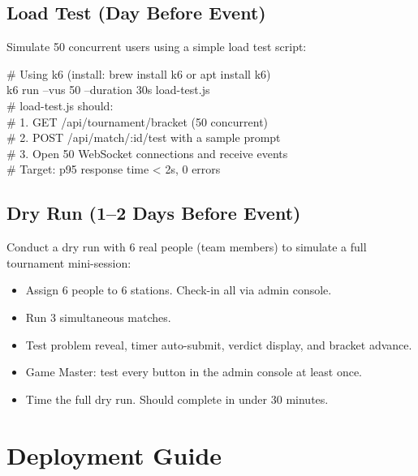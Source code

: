 \documentclass[11pt, a4paper]{article}
\begin{document}
\subsection{Load Test (Day Before Event)}

Simulate 50 concurrent users using a simple load test script:

\begin{tcolorbox}[codebox]
\small\color{white}\ttfamily
\textcolor{codegreen}{\# Using k6 (install: brew install k6 or apt install k6)}\\
k6 run --vus 50 --duration 30s load-test.js\\[0.2em]
\textcolor{codegreen}{\# load-test.js should:}\\
\textcolor{codegreen}{\# 1. GET /api/tournament/bracket (50 concurrent)}\\
\textcolor{codegreen}{\# 2. POST /api/match/:id/test with a sample prompt}\\
\textcolor{codegreen}{\# 3. Open 50 WebSocket connections and receive events}\\
\textcolor{codegreen}{\# Target: p95 response time < 2s, 0 errors}
\end{tcolorbox}

\subsection{Dry Run (1--2 Days Before Event)}

Conduct a dry run with 6 real people (team members) to simulate a full tournament mini-session:
\begin{itemize}[leftmargin=1.5cm, itemsep=2pt]
    \item Assign 6 people to 6 stations. Check-in all via admin console.
    \item Run 3 simultaneous matches.
    \item Test problem reveal, timer auto-submit, verdict display, and bracket advance.
    \item Game Master: test every button in the admin console at least once.
    \item Time the full dry run. Should complete in under 30 minutes.
\end{itemize}

\section{Deployment Guide}
\end{document}
